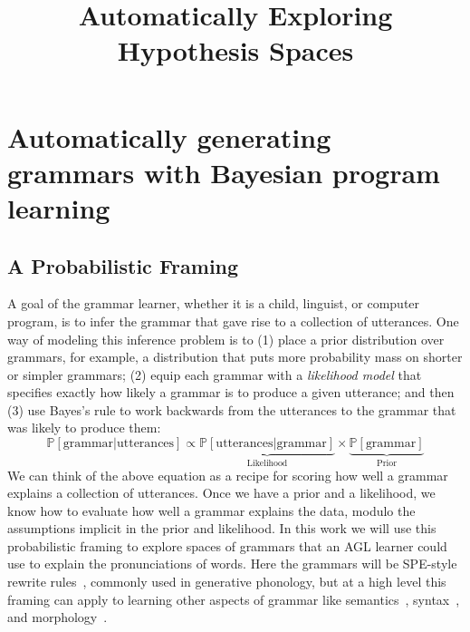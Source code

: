 \documentclass{article}
\title{Automatically Exploring Hypothesis Spaces}
\newcommand{\probability}{\mathds{P}} %
\begin{document}
\maketitle


\section{Automatically generating grammars with Bayesian program learning}

\subsection{A Probabilistic Framing}

A goal of the grammar learner, whether it is a child, linguist, or computer program, is to
infer the grammar that gave rise to
a collection of utterances.
One way of
modeling this inference problem is to (1) place a prior distribution over grammars, for example, a distribution that puts more probability mass on shorter or simpler grammars; (2) equip each grammar with a
\emph{likelihood model} that specifies exactly how likely a grammar is to produce a given utterance;
and then (3) use Bayes's rule to work backwards from the
utterances to the grammar that was likely to produce them:
\begin{equation}
  \probability\left[\text{grammar}|\text{utterances} \right]\propto\underbrace{\probability\left[\text{utterances}|\text{grammar} \right]}_{\text{Likelihood}}\times\underbrace{\probability\left[\text{grammar} \right]}_{\text{Prior}}\label{posterior}
\end{equation}
We can think of the above equation as a recipe for
scoring how well a grammar explains a
collection of utterances.
Once we have a prior and a likelihood,
we know how to evaluate how well a grammar explains the data, modulo the assumptions implicit in the
prior and likelihood.
In this work we will use this probabilistic framing
to explore spaces of grammars
that an AGL learner could use to explain
the pronunciations of words.
Here the grammars will be SPE-style rewrite rules~\cite{chomsky1968sound},
commonly used in generative phonology,
but at a high level this framing can apply to
learning other aspects of grammar like semantics~\cite{piantadosi2011learning}, syntax~\cite{perfors2011learnability}, and morphology~\cite{tim}.
\end{document}
